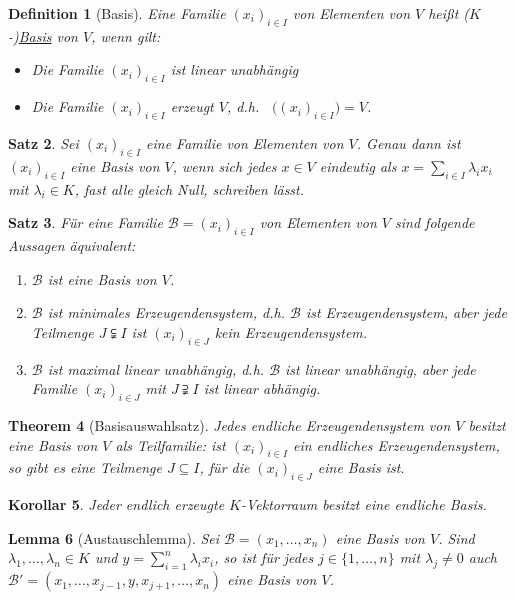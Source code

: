\documentclass[ngerman,a4paper]{report}
\theoremstyle{changebreak}
\newtheorem{theorem}{Theorem}[section]
\newtheorem{corollar}[theorem]{Korollar}
\newtheorem{lemma}[theorem]{Lemma}
\newtheorem{satz}[theorem]{Satz}
\newtheorem{definition}[theorem]{Definition}
\newcommand{\begriff}[2][]{\uline{#2}\index{#1#2}}
\DeclareMathOperator{\spank}{span_K}
\begin{document}
\begin{definition}[Basis]
	Eine Familie $(x_i)_{i\in I}$ von Elementen von $V$ heißt ($K$-)\begriff{Basis} von $V$, wenn gilt:
	\begin{itemize}
		\item[(B1)] Die Familie $(x_i)_{i\in I}$ ist linear unabhängig
		\item[(B2)] Die Familie $(x_i)_{i\in I}$ erzeugt $V$, d.h. $\spank\big( (x_i)_{i\in I} \big) = V$.
	\end{itemize}
\end{definition}
\addtocounter{theorem}{1}
\begin{satz}
	Sei $(x_i)_{i\in I}$ eine Familie von Elementen  von $V$. Genau dann ist $(x_i)_{i\in I}$ eine Basis von $V$, wenn sich jedes $x\in V$ eindeutig als $x=\sum_{i\in I} \lambda_i x_i$ mit $\lambda_i\in K$, fast alle gleich Null, schreiben lässt.
\end{satz}
\addtocounter{theorem}{1}
\begin{satz}
	Für eine Familie $\mathcal{B} = (x_i)_{i\in I}$ von Elementen von $V$ sind folgende Aussagen äquivalent:
	\begin{enumerate}[(1)]
		\item $\mathcal{B}$ ist eine Basis von $V$.
		\item $\mathcal{B}$ ist minimales Erzeugendensystem, d.h. $\mathcal{B}$ ist Erzeugendensystem, aber jede Teilmenge $J\subsetneqq I$ ist $(x_i)_{i\in J}$ kein Erzeugendensystem.
		\item $\mathcal{B}$ ist maximal linear unabhängig, d.h. $\mathcal{B}$ ist linear unabhängig, aber jede Familie $(x_i)_{i\in J}$ mit $J \supsetneqq I$ ist linear abhängig.
	\end{enumerate}
\end{satz}

\begin{theorem}[Basisauswahlsatz]
	Jedes endliche Erzeugendensystem von $V$ besitzt eine Basis von $V$ als Teilfamilie: ist $(x_i)_{i\in I}$ ein endliches Erzeugendensystem, so gibt es eine Teilmenge $J\subseteq I$, für die $(x_i)_{i\in J}$ eine Basis ist.
\end{theorem}

\begin{corollar}
	Jeder endlich erzeugte $K$-Vektorraum besitzt eine endliche Basis.
\end{corollar}
\addtocounter{theorem}{2}
\begin{lemma}[Austauschlemma]
	Sei $\mathcal{B}= (x_1, \dotsc, x_n)$ eine Basis von $V$. Sind $\lambda_1, \dotsc, \lambda_n \in K$ und $y = \sum_{i=1}^{n} \lambda_i x_i$, so ist für jedes $j\in\{ 1, \dotsc, n \}$ mit $\lambda_j\neq 0$ auch $\mathcal{B}' = (x_1, \dotsc, x_{j-1}, y, x_{j+1}, \dotsc, x_n)$ eine Basis von $V$.
\end{lemma}
\end{document}

